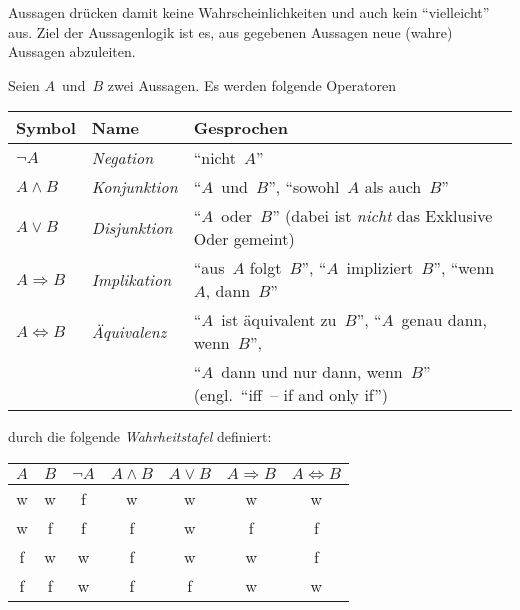 \documentclass[a4paper]{article}
\begin{document}
Aussagen drücken damit keine Wahrscheinlichkeiten und auch kein "`vielleicht"' aus. Ziel der Aussagenlogik ist es, aus gegebenen Aussagen neue (wahre) Aussagen abzuleiten.

\begin{definition}
    Seien $A$~und~$B$ zwei Aussagen. Es werden folgende Operatoren
    \begin{center}
        \begin{tabular}{@{}lll@{}}\toprule
            Symbol                & Name               & Gesprochen                                                             \\\midrule
            $\neg A$              & \emph{Negation}    & "`nicht~$A$"'                                                          \\
            $A \wedge B$          & \emph{Konjunktion} & "`$A$~und~$B$"', "`sowohl~$A$ als auch~$B$"'                           \\
            $A \vee B$            & \emph{Disjunktion} & "`$A$~oder~$B$"' (dabei ist \emph{nicht} das Exklusive Oder gemeint)   \\
            $A \Rightarrow B$     & \emph{Implikation} & "`aus~$A$ folgt~$B$"', "`$A$~impliziert~$B$"', "`wenn~$A$, dann~$B$"'  \\
            $A \Leftrightarrow B$ & \emph{Äquivalenz}  & "`$A$~ist äquivalent zu~$B$"', "`$A$~genau dann, wenn~$B$"',           \\
                                  &                    & "`$A$~dann und nur dann, wenn~$B$"' (engl.\ "`iff~-- if and only if"') \\\bottomrule
        \end{tabular}
    \end{center}
    durch die folgende \emph{Wahrheitstafel} definiert:
    \begin{center}
        \begin{tabular}{@{}cc@{\colsep}ccccc@{}}\toprule
            $A$ & $B$ & $\neg A$ & $A \wedge B$ & $A \vee B$ & $A \Rightarrow B$ & $A \Leftrightarrow B$ \\\midrule
            w   & w   & f        & w            & w          & w                 & w                     \\
            w   & f   & f        & f            & w          & f                 & f                     \\
            f   & w   & w        & f            & w          & w                 & f                     \\
            f   & f   & w        & f            & f          & w                 & w                     \\\bottomrule
        \end{tabular}
    \end{center}
\end{definition}
\end{document}
